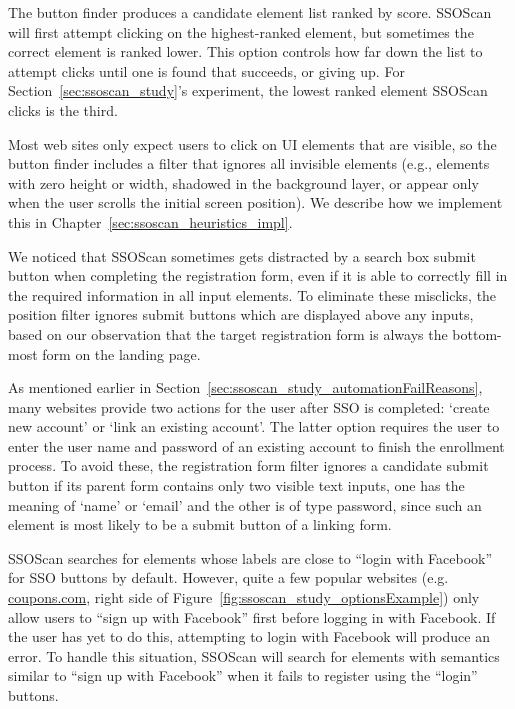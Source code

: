  The button finder produces a candidate element list ranked by score.  SSOScan will first attempt clicking on the highest-ranked element, but sometimes the correct element is ranked lower.  This option controls how far down the list to attempt clicks until one is found that succeeds, or giving up.  For Section~\ref{sec:ssoscan_study}'s experiment, the lowest ranked element SSOScan clicks is the third.

 Most web sites only expect users to click on UI elements that are visible, so the button finder includes a filter that ignores all invisible elements (e.g., elements with zero height or width, shadowed in the background layer, or appear only when the user scrolls the initial screen position).  We describe how we implement this in Chapter~\ref{sec:ssoscan_heuristics_impl}.  %

 We noticed that SSOScan sometimes gets distracted by a search box submit button when completing the registration form, even if it is able to correctly fill in the required information in all input elements.  To eliminate these misclicks, the position filter ignores submit buttons which are displayed above any inputs, based on our observation that the target registration form is always the bottom-most form on the landing page.

 As mentioned earlier in Section~\ref{sec:ssoscan_study_automationFailReasons}, many websites provide two actions for the user after SSO is completed: `create new account' or `link an existing account'.  The latter option requires the user to enter the user name and password of an existing account to finish the enrollment process.  To avoid these, the registration form filter ignores a candidate submit button if its parent form contains only two visible text inputs, one has the meaning of `name' or `email' and the other is of type password, since such an element is most likely to be a submit button of a linking form.

 SSOScan searches for elements whose labels are close to ``login with Facebook'' for SSO buttons by default.  However, quite a few popular websites (e.g. \url{coupons.com}, right side of Figure~\ref{fig:ssoscan_study_optionsExample}) only allow users to ``sign up with Facebook'' first before logging in with Facebook.  If the user has yet to do this, attempting to login with Facebook will produce an error.  To handle this situation, SSOScan will search for elements with semantics similar to ``sign up with Facebook'' when it fails to register using the ``login'' buttons.

